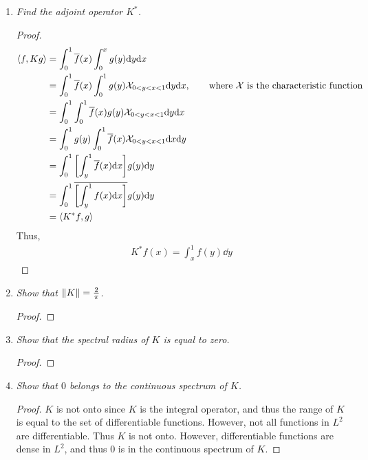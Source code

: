 \documentclass{article} %
\theoremstyle{plain}
\newcommand{\VEC}[2]{\left\langle #1, #2 \right\rangle}
\numberwithin{equation}{section} %
\numberwithin{figure}{section} %
\numberwithin{table}{section} %
\begin{document}
\begin{enumerate}[\it a)]
    \item
        \emph{Find the adjoint operator $K^*$.}
        \begin{proof}
            \begin{align*}
                \VEC{f}{Kg} &= \int_0^1 \overline{f}(x)\int_0^x g(y)\dd y \dd x \\
                &= \int_0^1 \overline{f}(x)\int_0^1 g(y)\mathcal{X}_{0 < y < x < 1}\dd y \dd x, \qquad \text{where $\mathcal{X}$ is the characteristic function} \\
                &= \int_0^1 \int_0^1 \overline{f}(x)g(y)\mathcal{X}_{0<y<x<1}\dd y \dd x \\
                &= \int_0^1 g(y) \int_0^1 \overline{f}(x)\mathcal{X}_{0<y<x<1}\dd x \dd y \\
                &= \int_0^1 \qty[\int_y^1 \overline{f}(x)\dd x]g(y) \dd y \\
                &= \int_0^1 \overline{\qty[\int_y^1 f(x)\dd x]}g(y) \dd y \\
                &= \VEC{K^* f}{g}
            \end{align*}
            Thus,
            \begin{align*}
                K^*f(x) = \int_x^1 f(y)\dd y
            \end{align*}
        \end{proof}
    \item
        \emph{Show that $\norm{K} = \frac{2}{\pi}$.}
        \begin{proof}
        \end{proof}
    \item
        \emph{Show that the spectral radius of $K$ is equal to zero.}
        \begin{proof}
        \end{proof}
    \item
        \emph{Show that $0$ belongs to the continuous spectrum of $K$.}
        \begin{proof}
            $K$ is not onto since $K$ is the integral operator, and thus the range of $K$ is equal to the set of differentiable functions.  However, not all functions in $L^2$ are differentiable.  Thus $K$ is not onto.  However, differentiable functions are dense in $L^2$, and thus $0$ is in the continuous spectrum of $K$.
        \end{proof}
\end{enumerate}
\end{document}
